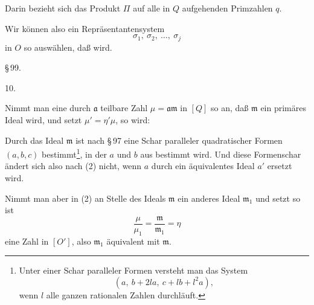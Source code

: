 
Darin bezieht sich das Produkt $\Pi$ auf alle in $Q$ aufgehenden Primzahlen $q$.

Wir können also ein Repräsentantensystem
\[
\sigma_1,\ \sigma_2,\ \dots,\ \sigma_j
\]
in $O$ so auswählen, daß
wird.

\begin{center}
\S\,99. 
\end{center}

10. 

Nimmt man eine durch $\mathfrak{a}$ teilbare Zahl $\mu = \mathfrak{a}\mathfrak{m}$ in $[Q]$ so an, daß $\mathfrak{m}$ ein primäres Ideal wird, und setzt $\mu' = \eta'\mu$, so wird:

Durch das Ideal $\mathfrak{m}$ ist nach \S\,97 eine Schar paralleler quadratischer Formen $(a,b,c)$ bestimmt\footnote{Unter einer Schar paralleler Formen versteht man das System \[ (a,\ b+2la,\ c+lb+l^2a), \] wenn $l$ alle ganzen rationalen Zahlen durchläuft.}, in der $a$ und $b$ aus
bestimmt wird. %
Und diese Formenschar ändert sich also nach (2) nicht, wenn $a$ durch ein äquivalentes Ideal $a'$ ersetzt wird.

Nimmt man aber in (2) an Stelle des Ideals $\mathfrak{m}$ ein anderes Ideal $\mathfrak{m}_1$ und setzt
so ist
\[
\frac{\mu}{\mu_1} = \frac{\mathfrak{m}}{\mathfrak{m}_1} = \eta
\]
eine Zahl in $[O']$, also $\mathfrak{m}_1$ äquivalent mit $\mathfrak{m}$.
